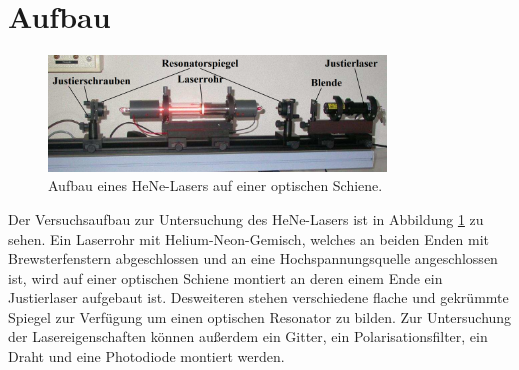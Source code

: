 \section{Aufbau}
\label{sec:Aufbau}

\begin{figure}
\centering
\includegraphics[width=0.8\textwidth]{content/images/aufbau.png}
\caption{Aufbau eines HeNe-Lasers auf einer optischen Schiene.\cite{V64}}
\label{fig:aufbau}
\end{figure}

Der Versuchsaufbau zur Untersuchung des HeNe-Lasers ist in Abbildung \ref{fig:aufbau} zu sehen.
Ein Laserrohr mit Helium-Neon-Gemisch, welches an beiden Enden mit Brewsterfenstern abgeschlossen und an eine Hochspannungsquelle angeschlossen ist, wird auf einer optischen Schiene montiert an deren einem Ende ein Justierlaser aufgebaut ist.
Desweiteren stehen verschiedene flache und gekrümmte Spiegel zur Verfügung um einen optischen Resonator zu bilden. Zur Untersuchung der Lasereigenschaften können außerdem ein Gitter, ein Polarisationsfilter, ein Draht und eine Photodiode montiert werden. 